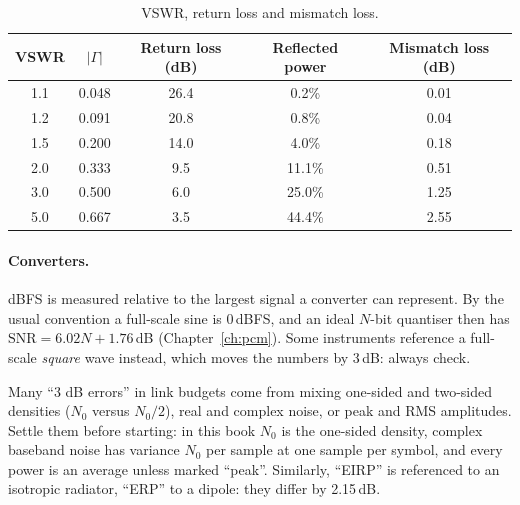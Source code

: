 \begin{table}[htbp]\centering\small
\caption{VSWR, return loss and mismatch loss.}\label{tab:appA:vswr}
\begin{tabular}{@{}ccccc@{}}
\toprule
VSWR & $|\Gamma|$ & Return loss (dB) & Reflected power & Mismatch loss (dB)\\
\midrule
1.1 & 0.048 & 26.4 & 0.2\% & 0.01\\
1.2 & 0.091 & 20.8 & 0.8\% & 0.04\\
1.5 & 0.200 & 14.0 & 4.0\% & 0.18\\
2.0 & 0.333 & 9.5 & 11.1\% & 0.51\\
3.0 & 0.500 & 6.0 & 25.0\% & 1.25\\
5.0 & 0.667 & 3.5 & 44.4\% & 2.55\\
\bottomrule
\end{tabular}
\end{table}


\paragraph{Converters.} dBFS is measured relative to the largest signal a converter can
represent. By the usual convention a full-scale sine is 0\,dBFS, and an ideal $N$-bit quantiser
then has $\mathrm{SNR}=6.02N+1.76$\,dB (Chapter~\ref{ch:pcm}). Some instruments reference a
full-scale \emph{square} wave instead, which moves the numbers by 3\,dB: always check.

\begin{pitfall}
Many ``3 dB errors'' in link budgets come from mixing one-sided and two-sided densities
($N_0$ versus $N_0/2$), real and complex noise, or peak and RMS amplitudes. Settle them before
starting: in this book $N_0$ is the one-sided density, complex baseband noise has variance $N_0$
per sample at one sample per symbol, and every power is an average unless marked ``peak''.
Similarly, ``EIRP'' is referenced to an isotropic radiator, ``ERP'' to a dipole: they differ by
2.15\,dB.
\end{pitfall}


